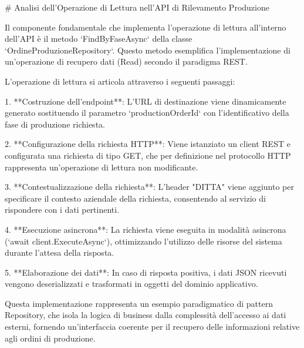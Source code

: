 # Analisi dell'Operazione di Lettura nell'API di Rilevamento Produzione

Il componente fondamentale che implementa l'operazione di lettura all'interno dell'API è il metodo `FindByFaseAsync` della classe `OrdineProduzioneRepository`. Questo metodo esemplifica l'implementazione di un'operazione di recupero dati (Read) secondo il paradigma REST.

L'operazione di lettura si articola attraverso i seguenti passaggi:

1. **Costruzione dell'endpoint**: L'URL di destinazione viene dinamicamente generato sostituendo il parametro `{productionOrderId}` con l'identificativo della fase di produzione richiesta.

2. **Configurazione della richiesta HTTP**: Viene istanziato un client REST e configurata una richiesta di tipo GET, che per definizione nel protocollo HTTP rappresenta un'operazione di lettura non modificante.

3. **Contestualizzazione della richiesta**: L'header "DITTA" viene aggiunto per specificare il contesto aziendale della richiesta, consentendo al servizio di rispondere con i dati pertinenti.

4. **Esecuzione asincrona**: La richiesta viene eseguita in modalità asincrona (`await client.ExecuteAsync`), ottimizzando l'utilizzo delle risorse del sistema durante l'attesa della risposta.

5. **Elaborazione dei dati**: In caso di risposta positiva, i dati JSON ricevuti vengono deserializzati e trasformati in oggetti del dominio applicativo.

Questa implementazione rappresenta un esempio paradigmatico di pattern Repository, che isola la logica di business dalla complessità dell'accesso ai dati esterni, fornendo un'interfaccia coerente per il recupero delle informazioni relative agli ordini di produzione.

